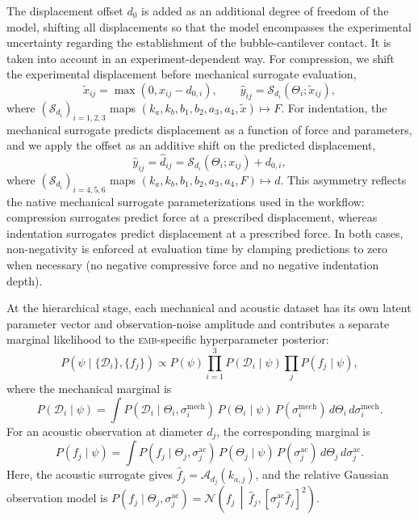 \documentclass[%
 aip,
 jcp,
 amsmath,amssymb,
 preprint,%
]{revtex4-1}
\begin{document}
The displacement offset $d_0$ is added as an additional degree of freedom of the model, shifting all displacements so that the model encompasses the experimental uncertainty regarding the establishment of the bubble-cantilever contact. It is taken into account in an experiment-dependent way. For compression, we shift the experimental displacement before mechanical surrogate evaluation,
\begin{equation}
\tilde{x}_{ij} = \max(0, x_{ij} - d_{0,i}), \qquad
\hat{y}_{ij} = \mathcal{S}_{d_i}(\Theta_i;\tilde{x}_{ij}),
\end{equation}
where $(\mathcal{S}_{d_i})_{i=1,2,3}$ maps $(k_a,k_b,b_1,b_2,a_3,a_4,\tilde{x}) \mapsto F$.
For indentation, the mechanical surrogate predicts displacement as a function of force and parameters, and we apply the offset as an additive shift on the predicted displacement,
\begin{equation}
\hat{y}_{ij} = \hat{d}_{ij} = \mathcal{S}_{d_i}(\Theta_i;x_{ij}) + d_{0,i},
\end{equation}
where $(\mathcal{S}_{d_i})_{i=4,5,6}$ maps $(k_a,k_b,b_1,b_2,a_3,a_4,F) \mapsto d$. This asymmetry reflects the native mechanical surrogate parameterizations used in the workflow: compression surrogates predict force at a prescribed displacement, whereas indentation surrogates predict displacement at a prescribed force. In both cases, non-negativity is enforced at evaluation time by clamping predictions to zero when necessary (no negative compressive force and no negative indentation depth).

At the hierarchical stage, each mechanical and acoustic dataset has its own latent parameter vector and observation-noise amplitude and contributes a separate marginal likelihood to the \textsc{emb}-specific hyperparameter posterior:
\begin{equation}
P(\psi \mid \{\mathcal{D}_i\},\{f_j\})
\propto
P(\psi)\prod_{i=1}^{3} P(\mathcal{D}_i \mid \psi)
\prod_j P(f_j \mid \psi),
\end{equation}
where the mechanical marginal is
\begin{equation}
P(\mathcal{D}_i \mid \psi)
=
\int
P(\mathcal{D}_i \mid \Theta_i,\sigma_i^{\mathrm{mech}})\,
P(\Theta_i \mid \psi)\,
P(\sigma_i^{\mathrm{mech}})\,
d\Theta_i\, d\sigma_i^{\mathrm{mech}}.
\end{equation}
For an acoustic observation at diameter $d_j$, the corresponding marginal is
\begin{equation}
P(f_j\mid\psi)
=
\int
P(f_j\mid \Theta_j,\sigma_j^{\mathrm{ac}})\,
P(\Theta_j\mid\psi)\,
P(\sigma_j^{\mathrm{ac}})\,
d\Theta_j\,d\sigma_j^{\mathrm{ac}}.
\end{equation}
Here, the acoustic surrogate gives $\hat f_j=\mathcal{A}_{d_j}(k_{a,j})$, and the relative Gaussian observation model is $P(f_j\mid\Theta_j,\sigma_j^{\mathrm{ac}})=\mathcal{N}\!\left(f_j\,\middle|\,\hat f_j,[\sigma_j^{\mathrm{ac}}\hat f_j]^2\right)$.
\end{document}
